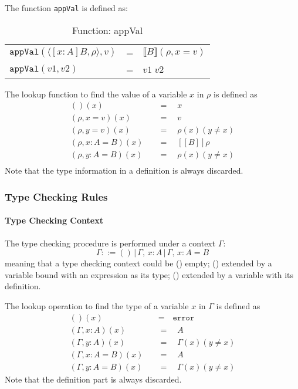 \documentclass{article}
\theoremstyle{remark}
\begin{document}
The function \texttt{appVal} is defined as:
\begin{table}[h]
  \centering
  \begin{tabular}{l l l}
    $\texttt{appVal}(\langle [x : A]B, \rho \rangle, v)$ & = & $\llbracket B \rrbracket (\rho, x = v)$  \\
    $\texttt{appVal}(v1, v2)$ & = & $v1 \; v2$
  \end{tabular}
  \caption{Function: appVal}
\end{table}

The lookup function to find the value of a variable $x$ in $\rho$ is defined as
\begin{align*}
  ()(x) \quad &= \quad x \\
  (\rho, x = v)(x) \quad &= \quad v \\
  (\rho, y = v)(x) \quad &= \quad \rho(x)(y \neq x) \\
  (\rho, x : A = B)(x) \quad &= \quad [\![B]\!]\rho \\
  (\rho, y : A = B)(x) \quad &= \quad \rho(x)(y \neq x) \\
\end{align*}
Note that the type information in a definition is always discarded.

\subsubsection{Type Checking Rules}
\paragraph{Type Checking Context}
The type checking procedure is performed under a context $\Gamma$:
\[
  \Gamma ::= ()\,|\,\Gamma,\,x : A\,|\,\Gamma,\,x : A = B
\]
meaning that a type checking context could be () empty; () extended by a variable bound with an expression as its type; () extended by a variable with its definition.

The lookup operation to find the type of a variable $x$ in $\Gamma$ is defined as
\begin{align*}
  ()(x) \quad &= \quad \texttt{error} \\
  (\Gamma, x : A)(x) \quad &= \quad A \\
  (\Gamma, y : A)(x) \quad &= \quad \Gamma(x)(y \neq x) \\
  (\Gamma, x : A = B)(x) \quad &= \quad A \\
  (\Gamma, y : A = B)(x) \quad &= \quad \Gamma(x)(y \neq x) 
\end{align*}
Note that the definition part is always discarded.
\end{document}
